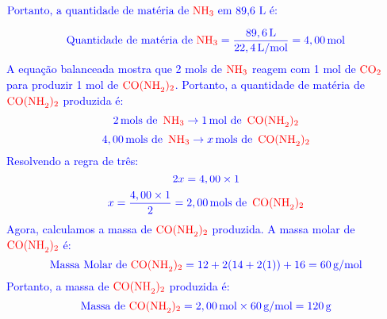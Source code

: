 \documentclass[a4paper, 12pt]{article}
\begin{document}
\begin{enumerate}
          $ \textcolor{blue}{\text{Portanto, a quantidade de matéria de } \textcolor{red}{\text{NH}_3} \text{ em 89,6 L é:}}$

          \[
              \textcolor{blue}{\text{Quantidade de matéria de } \textcolor{red}{\text{NH}_3} = \frac{89,6 \, \text{L}}{22,4 \, \text{L/mol}} = 4,00 \, \text{mol}}
          \]
          \textcolor{blue}{A equação balanceada mostra que 2 mols de \(\textcolor{red}{\text{NH}_3}\) reagem com 1 mol de \(\textcolor{red}{\text{CO}_2}\) para produzir 1 mol de \(\textcolor{red}{\text{CO(NH}_2)_2}\). Portanto, a quantidade de matéria de \(\textcolor{red}{\text{CO(NH}_2)_2}\) produzida é:}
          \[
              \textcolor{blue}{2 \, \text{mols de } \, \textcolor{red}{\text{NH}_3} \rightarrow 1 \, \text{mol de } \, \textcolor{red}{\text{CO(NH}_2)_2}}
          \]
          \[
              \textcolor{blue}{4,00 \, \text{mols de } \, \textcolor{red}{\text{NH}_3} \rightarrow x \, \text{mols de } \, \textcolor{red}{\text{CO(NH}_2)_2}}
          \]
          \textcolor{blue}{Resolvendo a regra de três:}
          \[
              \textcolor{blue}{2x = 4,00 \times 1}
          \]
          \[
              \textcolor{blue}{x = \frac{4,00 \times 1}{2} = 2,00 \, \text{mols de } \, \textcolor{red}{\text{CO(NH}_2)_2}}
          \]
          \textcolor{blue}{Agora, calculamos a massa de \(\textcolor{red}{\text{CO(NH}_2)_2}\) produzida. A massa molar de \(\textcolor{red}{\text{CO(NH}_2)_2}\) é:}
          \[
              \textcolor{blue}{\text{Massa Molar de } \textcolor{red}{\text{CO(NH}_2)_2} = 12 + 2(14 + 2(1)) + 16 = 60 \, \text{g/mol}}
          \]
          \textcolor{blue}{Portanto, a massa de \(\textcolor{red}{\text{CO(NH}_2)_2}\) produzida é:}
          \[
              \textcolor{blue}{\text{Massa de } \textcolor{red}{\text{CO(NH}_2)_2} = 2,00 \, \text{mol} \times 60 \, \text{g/mol} = 120 \, \text{g}}
          \]


\end{enumerate}
\end{document}
